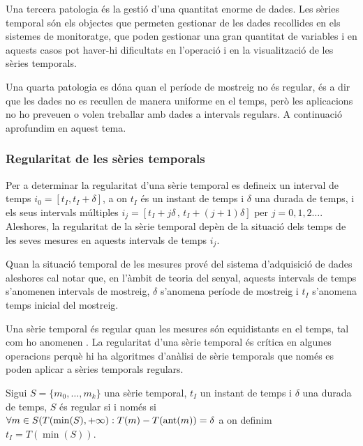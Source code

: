 Una tercera patologia és la gestió d’una quantitat enorme de dades.
Les sèries temporal són els objectes que permeten gestionar de les
dades recollides en els sistemes de monitoratge, que poden gestionar
una gran quantitat de variables i en aquests casos pot haver-hi
dificultats en l'operació i en la visualització de les sèries
temporals.


Una quarta patologia es dóna quan el període de mostreig no és
regular, és a dir que les dades no es recullen de manera uniforme en
el temps, però les aplicacions no ho preveuen o volen treballar amb
dades a intervals regulars. A continuació aprofundim en aquest tema.






\subsubsection{Regularitat de les sèries temporals} 


Per a determinar la regularitat d'una sèrie temporal es defineix un
interval de temps $i_0=[t_I,t_I+\delta]$, a on $t_I$ és un instant de
temps i $\delta$ una durada de temps, i els seus intervals múltiples
$i_j=[t_I+j\delta\, ,\, t_I+(j+1)\delta]$ per
$j=0,1,2\ldots$. Aleshores, la regularitat de la sèrie temporal depèn
de la situació dels temps de les seves mesures en aquests intervals de
temps $i_j$.
 
Quan la situació temporal de les mesures prové del sistema
d'adquisició de dades aleshores cal notar que, en l'àmbit de
teoria del senyal, aquests intervals de temps s'anomenen intervals de
mostreig, $\delta$ s'anomena període de mostreig i $t_I$ s'anomena
temps inicial del mostreig.


Una sèrie temporal és regular quan les mesures són equidistants en el
temps, tal com ho anomenen \textcite{last:hetland}.  La regularitat
d'una sèrie temporal és crítica en algunes operacions perquè hi ha
algoritmes d'anàlisi de sèrie temporals que només es poden aplicar a
sèries temporals regulars.
\begin{definition}
  \label{def:st:regular}
  Sigui $S=\{m_0,\ldots,m_k\}$ una sèrie temporal, $t_I$ un instant de
  temps i $\delta$ una durada de temps, $S$ és regular si i
  només si $\forall m \in S(T(\min(S),+\infty):T(m) - T(\operatorname*{ant}(m)) =
  \delta$ a on definim $t_I=T(\min(S))$.
\end{definition}

